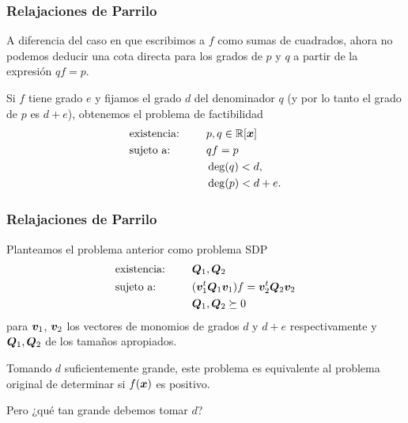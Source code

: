 \documentclass[aspectratio=169,12pt,spanish]{beamer}
\begin{document}

\begin{frame}

\frametitle{Relajaciones de Parrilo}

A diferencia del caso en que escribimos a $f$ como sumas de cuadrados, ahora no podemos deducir una cota directa para los grados de $p$ y $q$ a partir de la expresión $qf = p$.

Si $f$ tiene grado $e$ y fijamos el grado $d$ del denominador $q$ (y por lo tanto el grado de $p$ es $d + e$), obtenemos el problema de factibilidad
\begin{alignat*}{2}
  & \text{existencia: } & & p, q \in \mathbb{R}[\bm{x}]  \\
  & \text{sujeto a: } & \quad & q f = p \\
  &&& \deg(q) < d, \\
  &&& \deg(p) < d + e.
\end{alignat*}
\end{frame}


\begin{frame}

\frametitle{Relajaciones de Parrilo}

Planteamos el problema anterior como problema SDP
\begin{alignat*}{2}
  & \text{existencia: } & & \bm{Q}_1, \bm{Q}_2 \\
  & \text{sujeto a: } & \quad & (\bm{v}_1^t \bm{Q}_1 \bm{v}_1) f = \bm{v}_2^t \bm{Q}_2 \bm{v}_2 \\
  &&& \bm{Q}_1, \bm{Q}_2 \succeq 0
\end{alignat*}
para $\bm{v}_1$, $\bm{v}_2$ los vectores de monomios de grados $d$ y $d+e$ respectivamente y $\bm{Q}_1, \bm{Q}_2$ de los tamaños apropiados.

Tomando $d$ suficientemente grande, este problema es equivalente al problema original de determinar si $f(\bm{x})$ es positivo.

Pero ¿qué tan grande debemos tomar $d$?
\end{frame}

\end{document}
